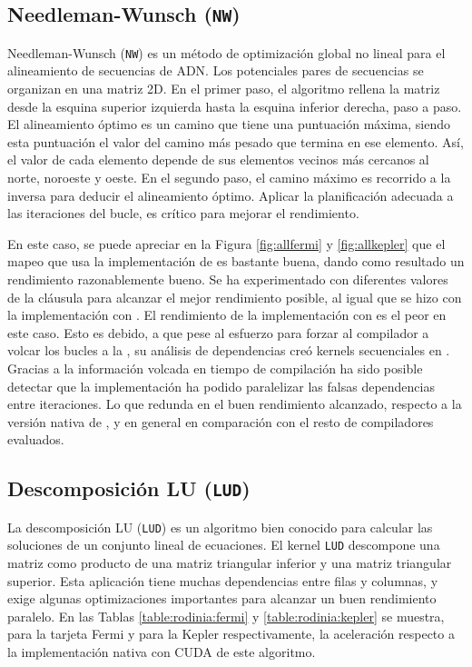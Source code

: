 \subsection{Needleman-Wunsch (\texttt{NW})}

Needleman-Wunsch (\texttt{NW}) es un método de optimización global no lineal para 
el alineamiento de secuencias de ADN.
Los potenciales pares de secuencias se organizan en una matriz 2D. 
En el primer paso, el algoritmo rellena la matriz desde la esquina superior izquierda 
hasta la esquina inferior derecha, paso a paso.
El alineamiento óptimo es un camino que tiene una puntuación máxima, siendo esta 
puntuación el valor del camino más pesado que termina en ese elemento.
Así, el valor de cada elemento depende de sus elementos vecinos más cercanos al norte, 
noroeste y oeste. En el segundo paso, el camino máximo es recorrido a la inversa para 
deducir el alineamiento óptimo. Aplicar la planificación adecuada a las iteraciones del 
bucle, es crítico para mejorar el rendimiento.

En este caso, se puede apreciar en la Figura \ref{fig:allfermi} y \ref{fig:allkepler} que 
el mapeo que usa la implementación de \CAPS{} \OpenACC{} es bastante buena, dando
como resultado un rendimiento razonablemente bueno. Se ha experimentado con diferentes
valores de la cláusula \gang{} para alcanzar el mejor rendimiento posible, al igual
que se hizo con la implementación con \PGI{}.
El rendimiento de la implementación con \PGI{} es el peor en este caso. Esto es debido, a 
que pese al esfuerzo para forzar al compilador a volcar los bucles a la \gpu{}, su 
análisis de dependencias creó kernels secuenciales en \GPU{}. Gracias a la información
volcada en tiempo de compilación ha sido posible detectar que la implementación \accULL{} 
ha podido paralelizar las falsas dependencias entre iteraciones. Lo que redunda en el
buen rendimiento alcanzado, respecto a la versión nativa de \CUDA{}, y en general en comparación con el resto de compiladores evaluados.

\subsection{Descomposición LU (\texttt{LUD})}

La descomposición LU (\texttt{LUD}) es un algoritmo bien conocido
para calcular las soluciones de un conjunto lineal de ecuaciones.
El kernel \texttt{LUD} descompone una matriz como producto de una matriz triangular
inferior y una matriz triangular superior. Esta aplicación tiene muchas dependencias 
entre filas y columnas, y exige algunas optimizaciones importantes para alcanzar
un buen rendimiento paralelo.
En las Tablas \ref{table:rodinia:fermi} y \ref{table:rodinia:kepler} se muestra, 
para la tarjeta Fermi y para la Kepler respectivamente, la aceleración respecto 
a la implementación nativa con CUDA de este algoritmo.

